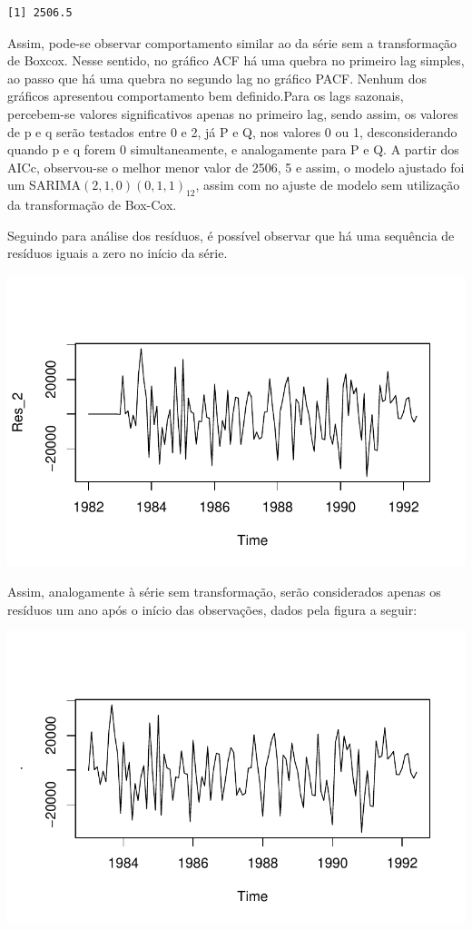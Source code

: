 \documentclass[
  letterpaper,
  DIV=11,
  numbers=noendperiod]{scrartcl}
\begin{document}
\begin{verbatim}
[1] 2506.5
\end{verbatim}

Assim, pode-se observar comportamento similar ao da série sem a
transformação de Boxcox. Nesse sentido, no gráfico ACF há uma quebra no
primeiro lag simples, ao passo que há uma quebra no segundo lag no
gráfico PACF. Nenhum dos gráficos apresentou comportamento bem
definido.Para os lags sazonais, percebem-se valores significativos
apenas no primeiro lag, sendo assim, os valores de p e q serão testados
entre 0 e 2, já P e Q, nos valores 0 ou 1, desconsiderando quando p e q
forem 0 simultaneamente, e analogamente para P e Q. A partir dos AICc,
observou-se o melhor menor valor de 2506, 5 e assim, o modelo ajustado
foi um SARIMA\((2, 1, 0)(0, 1, 1)_{12}\), assim com no ajuste de modelo
sem utilização da transformação de Box-Cox.

Seguindo para análise dos resíduos, é possível observar que há uma
sequência de resíduos iguais a zero no início da série.

\includegraphics{T2_grupo10_files/figure-pdf/unnamed-chunk-7-1.pdf}

Assim, analogamente à série sem transformação, serão considerados apenas
os resíduos um ano após o início das observações, dados pela figura a
seguir:

\includegraphics{T2_grupo10_files/figure-pdf/unnamed-chunk-8-1.pdf}
\end{document}

